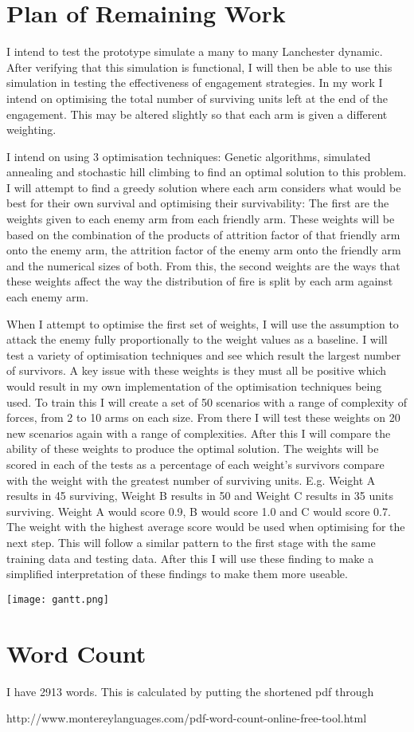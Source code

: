 
\chapter{Plan of Remaining Work}
I intend to test the prototype simulate a many to many Lanchester dynamic. After verifying that this simulation is functional, I will then be able to use this simulation in testing the effectiveness of engagement strategies. In my work I intend on optimising the total number of surviving units left at the end of the engagement. This may be altered slightly so that each arm is given a different weighting. 

I intend on using 3 optimisation techniques: Genetic algorithms, simulated annealing and stochastic hill climbing to find an optimal solution to this problem. I will attempt to find a greedy solution where each arm considers what would be best for their own survival and optimising their survivability:
The first are the weights given to each enemy arm from each friendly arm. These weights will be based on the combination of the products of attrition factor of that friendly arm onto the enemy arm, the attrition factor of the enemy arm onto the friendly arm and the numerical sizes of both. 
From this, the second weights are the ways that these weights affect the way the distribution of fire is split by each arm against each enemy arm.

When I attempt to optimise the first set of weights, I will use the assumption to attack the enemy fully proportionally to the weight values as a baseline. I will test a variety of optimisation techniques and see which result the largest number of survivors. A key issue with these weights is they must all be positive which would result in my own implementation of the optimisation techniques being used. 
To train this I will create a set of 50 scenarios with a range of complexity of forces, from 2 to 10 arms on each size. From there I will test these weights on 20 new scenarios again with a range of complexities.
After this I will compare the ability of these weights to produce the optimal solution. The weights will be scored in each of the tests as a percentage of each weight’s survivors compare with the weight with the greatest number of surviving units. E.g. Weight A results in 45 surviving, Weight B results in 50 and Weight C results in 35 units surviving. Weight A would score 0.9, B would score 1.0 and C would score 0.7. The weight with the highest average score would be used when optimising for the next step. 
This will follow a similar pattern to the first stage with the same training data and testing data. After this I will use these finding to make a simplified interpretation of these findings to make them more useable. 

\begin{landscape}
    \texttt{[image: gantt.png]}
\end{landscape}

\chapter{Word Count}
I have 2913 words. This is calculated by putting the shortened pdf through 

http://www.montereylanguages.com/pdf-word-count-online-free-tool.html